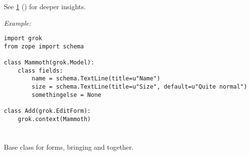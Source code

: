     See \ref{grok-form} () for deeper insights.

    \emph{Example:}
\begin{verbatim}
import grok
from zope import schema

class Mammoth(grok.Model):
    class fields:
        name = schema.TextLine(title=u"Name")
        size = schema.TextLine(title=u"Size", default=u"Quite normal")
        somethingelse = None

class Add(grok.EditForm):
    grok.context(Mammoth)
\end{verbatim}

\section{}
\label{grok-form}

    Base class for forms, bringing  and
     together.

